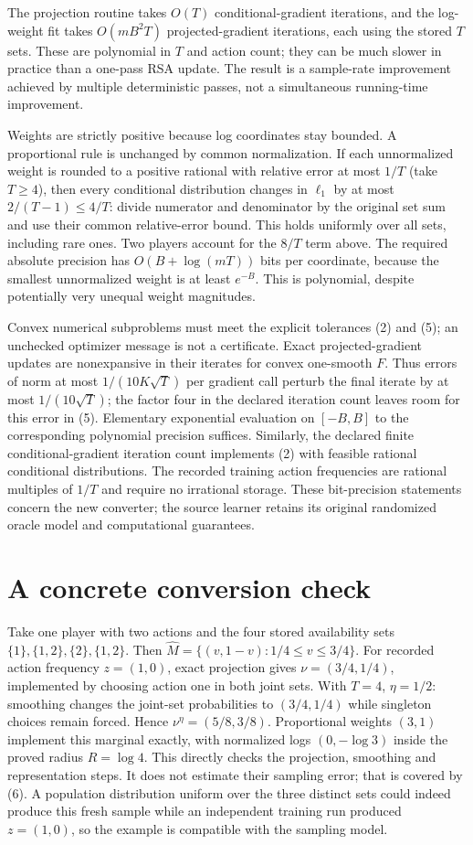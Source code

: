 \documentclass[11pt,a4paper]{article}
\begin{document}
The projection routine takes $O(T)$ conditional-gradient iterations, and the log-weight fit takes $O(mB^2T)$ projected-gradient iterations, each using the stored $T$ sets. These are polynomial in $T$ and action count; they can be much slower in practice than a one-pass RSA update. The result is a sample-rate improvement achieved by multiple deterministic passes, not a simultaneous running-time improvement.

Weights are strictly positive because log coordinates stay bounded. A proportional rule is unchanged by common normalization. If each unnormalized weight is rounded to a positive rational with relative error at most $1/T$ (take $T\ge4$), then every conditional distribution changes in $\ell_1$ by at most $2/(T-1)\le4/T$: divide numerator and denominator by the original set sum and use their common relative-error bound. This holds uniformly over all sets, including rare ones. Two players account for the $8/T$ term above. The required absolute precision has $O(B+\log(mT))$ bits per coordinate, because the smallest unnormalized weight is at least $e^{-B}$. This is polynomial, despite potentially very unequal weight magnitudes.

Convex numerical subproblems must meet the explicit tolerances (2) and (5); an unchecked optimizer message is not a certificate. Exact projected-gradient updates are nonexpansive in their iterates for convex one-smooth $F$. Thus errors of norm at most $1/(10K\sqrt T)$ per gradient call perturb the final iterate by at most $1/(10\sqrt T)$; the factor four in the declared iteration count leaves room for this error in (5). Elementary exponential evaluation on $[-B,B]$ to the corresponding polynomial precision suffices. Similarly, the declared finite conditional-gradient iteration count implements (2) with feasible rational conditional distributions. The recorded training action frequencies are rational multiples of $1/T$ and require no irrational storage. These bit-precision statements concern the new converter; the source learner retains its original randomized oracle model and computational guarantees.

\section{A concrete conversion check}
Take one player with two actions and the four stored availability sets $\{1\},\{1,2\},\{2\},\{1,2\}$. Then $\widehat M=\{(v,1-v):1/4\le v\le3/4\}$. For recorded action frequency $z=(1,0)$, exact projection gives $\nu=(3/4,1/4)$, implemented by choosing action one in both joint sets. With $T=4$, $\eta=1/2$: smoothing changes the joint-set probabilities to $(3/4,1/4)$ while singleton choices remain forced. Hence $\nu^\eta=(5/8,3/8)$. Proportional weights $(3,1)$ implement this marginal exactly, with normalized logs $(0,-\log3)$ inside the proved radius $R=\log4$. This directly checks the projection, smoothing and representation steps. It does not estimate their sampling error; that is covered by (6). A population distribution uniform over the three distinct sets could indeed produce this fresh sample while an independent training run produced $z=(1,0)$, so the example is compatible with the sampling model.
\end{document}
